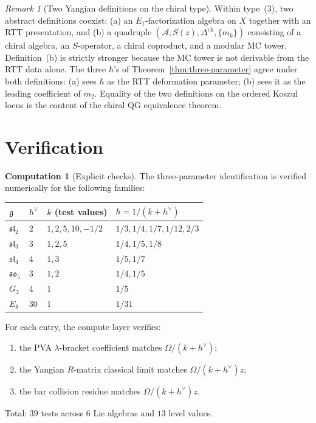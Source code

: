 \documentclass[11pt]{article}
\theoremstyle{plain}
\theoremstyle{definition}
\newtheorem{computation}[theorem]{Computation}
\theoremstyle{remark}
\newtheorem{remark}[theorem]{Remark}
\newcommand{\fg}{\mathfrak{g}}
\newcommand{\fsl}{\mathfrak{sl}}
\newcommand{\cA}{\mathcal{A}}
\numberwithin{equation}{section}
\begin{document}
\begin{remark}[Two Yangian definitions on the chiral type]
\label{rem:two-yangian-defs-3hbar}
Within type~(3), two abstract definitions coexist: (a) an
$E_1$-factorization algebra on $X$ together with an RTT
presentation, and (b) a quadruple $(\cA, S(z), \Delta^{\mathrm{ch}},
\{m_k\})$ consisting of a chiral algebra, an $S$-operator, a
chiral coproduct, and a modular MC tower. Definition~(b) is
strictly stronger because the MC tower is not derivable from the
RTT data alone. The three $\hbar$'s of
Theorem~\ref{thm:three-parameter} agree under both definitions: (a)
sees $\hbar$ as the RTT deformation parameter; (b) sees it as the
leading coefficient of $m_2$. Equality of the two definitions on
the ordered Koszul locus is the content of the chiral QG
equivalence theorem.
\end{remark}

\section{Verification}\label{sec:verification}

\begin{computation}[Explicit checks]\label{comp:explicit}
The three-parameter identification is verified numerically for the
following families:
\begin{center}
\renewcommand{\arraystretch}{1.25}
\begin{tabular}{llll}
\toprule
$\fg$ & $h^\vee$ & $k$ (test values) &
 $\hbar = 1/(k+h^\vee)$ \\
\midrule
$\fsl_2$ & $2$ & $1, 2, 5, 10, -1/2$ &
 $1/3, 1/4, 1/7, 1/12, 2/3$ \\
$\fsl_3$ & $3$ & $1, 2, 5$ &
 $1/4, 1/5, 1/8$ \\
$\fsl_4$ & $4$ & $1, 3$ &
 $1/5, 1/7$ \\
$\mathfrak{so}_5$ & $3$ & $1, 2$ &
 $1/4, 1/5$ \\
$G_2$ & $4$ & $1$ &
 $1/5$ \\
$E_8$ & $30$ & $1$ &
 $1/31$ \\
\bottomrule
\end{tabular}
\end{center}
For each entry, the compute layer verifies:
\begin{enumerate}[label=(\roman*)]
 \item the PVA $\lambda$-bracket coefficient matches $\Omega/(k+h^\vee)$;
 \item the Yangian $R$-matrix classical limit matches $\Omega/(k+h^\vee)z$;
 \item the bar collision residue matches $\Omega/(k+h^\vee)z$.
\end{enumerate}
Total: $39$ tests across $6$ Lie algebras and $13$ level values.
\end{computation}
\end{document}
